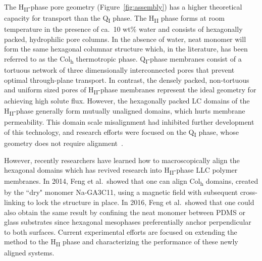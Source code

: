 \documentclass[journal=jpcbfk,manuscript=article]{achemso}
\begin{document}
  The H\textsubscript{II}-phase pore geometry (Figure~\ref{fig:assembly}) has a
  higher theoretical capacity for transport than the Q\textsubscript{I} phase.
  The H\textsubscript{II} phase forms at room temperature in the presence of
  ca.~10 wt\% water and consists of hexagonally packed, hydrophilic pore
  columns\cite{smith_ordered_1997}. In the absence of water, neat monomer will
  form the same hexagonal columnar structure which, in the literature, has been
  referred to as the Col\textsubscript{h} thermotropic
  phase\cite{feng_scalable_2014}. Q\textsubscript{I}-phase membranes consist of
  a tortuous network of three dimensionally interconnected pores that prevent
  optimal through-plane transport. In contrast, the densely packed, non-tortuous
  and uniform sized pores of H\textsubscript{II}-phase membranes represent the
  ideal geometry for achieving high solute
  flux\cite{matyka_tortuosity-porosity_2008}. However, the hexagonally packed LC
  domains of the H\textsubscript{II}-phase generally form mutually unaligned
  domains, which hurts membrane permeability. This domain scale misalignment had
  inhibited further development of this technology, and research efforts were
  focused on the Q\textsubscript{I} phase, whose geometry does not require
  alignment~\cite{zhou_new_2007}. 

  However, recently researchers have learned how to macroscopically align the
  hexagonal domains which has revived research into H\textsubscript{II}-phase LLC
  polymer membranes. In 2014, Feng et al.~showed that one can align Col\textsubscript{h}
  domains, created by the ``dry" monomer Na-GA3C11, using a magnetic field
  with subsequent cross-linking to lock the structure in
  place\cite{feng_scalable_2014}. In 2016, Feng et al.~showed that one could
  also obtain the same result by confining the neat monomer between PDMS or glass
  substrates since hexagonal mesophases preferentially anchor perpendicular to
  both surfaces\cite{feng_thin_2016}. Current experimental efforts are focused
  on extending the method to the H\textsubscript{II} phase and characterizing
  the performance of these newly aligned systems.
\end{document}
